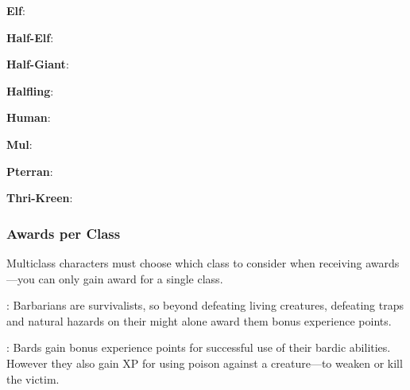 \textbf{Elf}:

\textbf{Half-Elf}:

\textbf{Half-Giant}:

\textbf{Halfling}:

\textbf{Human}:

\textbf{Mul}:

\textbf{Pterran}:

\textbf{Thri-Kreen}:

\subsubsection{Awards per Class}
Multiclass characters must choose which class to consider when receiving awards---you can only gain award for a single class.

\textbf{}: Barbarians are survivalists, so beyond defeating living creatures, defeating traps and natural hazards on their might alone award them bonus experience points.


\textbf{}: Bards gain bonus experience points for successful use of their bardic abilities. However they also gain XP for using poison against a creature---to weaken or kill the victim.



